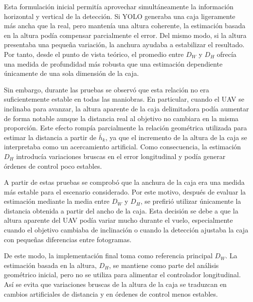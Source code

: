 \vspace{0.3cm}

Esta formulación inicial permitía aprovechar simultáneamente la información horizontal y vertical de la detección. Si YOLO generaba una caja ligeramente más ancha que la real, pero mantenía una altura coherente, la estimación basada en la altura podía compensar parcialmente el error. Del mismo modo, si la altura presentaba una pequeña variación, la anchura ayudaba a estabilizar el resultado. Por tanto, desde el punto de vista teórico, el promedio entre $D_W$ y $D_H$ ofrecía una medida de profundidad más robusta que una estimación dependiente únicamente de una sola dimensión de la caja.

\vspace{0.3cm}

Sin embargo, durante las pruebas se observó que esta relación no era suficientemente estable en todas las maniobras. En particular, cuando el UAV se inclinaba para avanzar, la altura aparente de la caja delimitadora podía aumentar de forma notable aunque la distancia real al objetivo no cambiara en la misma proporción. Este efecto rompía parcialmente la relación geométrica utilizada para estimar la distancia a partir de $\bar{h}_k$, ya que el incremento de la altura de la caja se interpretaba como un acercamiento artificial. Como consecuencia, la estimación $D_H$ introducía variaciones bruscas en el error longitudinal y podía generar órdenes de control poco estables.

\vspace{0.3cm}

A partir de estas pruebas se comprobó que la anchura de la caja era una medida más estable para el escenario considerado. Por este motivo, después de evaluar la estimación mediante la media entre $D_W$ y $D_H$, se prefirió utilizar únicamente la distancia obtenida a partir del ancho de la caja. Esta decisión se debe a que la altura aparente del UAV podía variar mucho durante el vuelo, especialmente cuando el objetivo cambiaba de inclinación o cuando la detección ajustaba la caja con pequeñas diferencias entre fotogramas.

\vspace{0.3cm}

De este modo, la implementación final toma como referencia principal $D_W$. La estimación basada en la altura, $D_H$, se mantiene como parte del análisis geométrico inicial, pero no se utiliza para alimentar el controlador longitudinal. Así se evita que variaciones bruscas de la altura de la caja se traduzcan en cambios artificiales de distancia y en órdenes de control menos estables.

